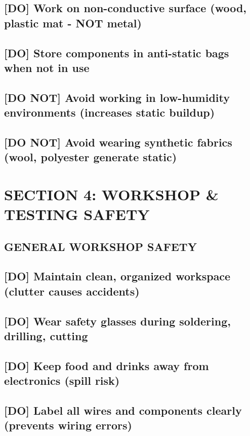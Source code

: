 \documentclass[11pt,letterpaper]{article}
\begin{document}
{{\subsection*{[DO] Work on non-conductive surface (wood, plastic mat - NOT metal)}

\subsection*{[DO] Store components in anti-static bags when not in use}

\subsection*{[DO NOT] Avoid working in low-humidity environments (increases static buildup)}

\subsection*{[DO NOT] Avoid wearing synthetic fabrics (wool, polyester generate static)}

\section{SECTION 4: WORKSHOP \& TESTING SAFETY}

\subsection*{GENERAL WORKSHOP SAFETY}

\subsection*{[DO] Maintain clean, organized workspace (clutter causes accidents)}

\subsection*{[DO] Wear safety glasses during soldering, drilling, cutting}

\subsection*{[DO] Keep food and drinks away from electronics (spill risk)}

\subsection*{[DO] Label all wires and components clearly (prevents wiring errors)}

}}
\end{document}
